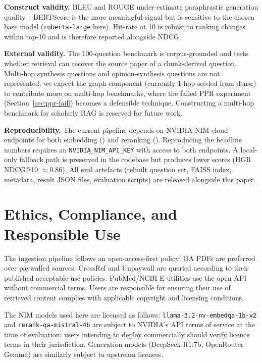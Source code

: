 \documentclass[journal]{IEEEtran}
\begin{document}
\textbf{Construct validity.} BLEU and ROUGE under-estimate
paraphrastic generation quality~\cite{zhang2019bertscore}. BERTScore
is the more meaningful signal but is sensitive to the chosen base
model (\texttt{roberta-large} here). Hit-rate at 10 is robust to
ranking changes within top-10 and is therefore reported alongside
NDCG.

\textbf{External validity.} The 100-question benchmark is
corpus-grounded and tests whether retrieval can recover the source
paper of a chunk-derived question. Multi-hop synthesis questions and
opinion-synthesis questions are not represented; we expect the graph
component (currently 1-hop seeded from dense) to contribute more on
multi-hop benchmarks, where the failed PPR experiment
(Section~\ref{sec:ppr-fail}) becomes a defensible technique.
Constructing a multi-hop benchmark for scholarly RAG is reserved for
future work.

\textbf{Reproducibility.} The current pipeline depends on NVIDIA NIM
cloud endpoints for both embedding ()
and reranking (). Reproducing the headline
numbers requires an \texttt{NVIDIA\_NIM\_API\_KEY} with access to
both endpoints. A local-only fallback path is preserved in the
codebase but produces lower scores (HGR NDCG@10 $\approx 0.86$). All
eval artefacts (rebuilt question set, FAISS index, metadata, result
JSON files, evaluation scripts) are released alongside this paper.

\section{Ethics, Compliance, and Responsible Use}
\label{sec:ethics}

The ingestion pipeline follows an open-access-first policy: OA PDFs
are preferred over paywalled sources. CrossRef and Unpaywall are
queried according to their published acceptable-use policies.
PubMed/NCBI E-utilities use the open API without commercial terms.
Users are responsible for ensuring their use of retrieved content
complies with applicable copyright and licensing conditions.

The NIM models used here are licensed as follows:
\texttt{llama-3.2-nv-embedqa-1b-v2} and \texttt{rerank-qa-mistral-4b}
are subject to NVIDIA's API terms of service at the time of
evaluation; users intending to deploy commercially should verify
licence terms in their jurisdiction. Generation models
(DeepSeek-R1:7b, OpenRouter Gemma) are similarly subject to
upstream licences.
\end{document}
